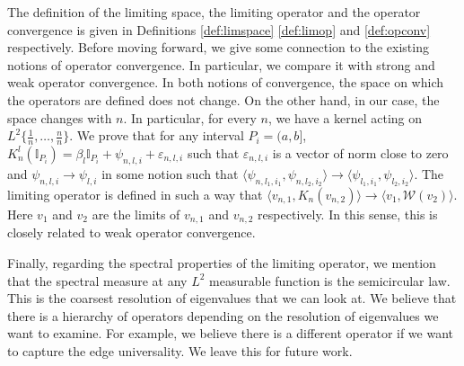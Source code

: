 \documentclass[reqno,12pt]{amsart}
\theoremstyle{plain}
\theoremstyle{definition}
\begin{document}
The definition of the limiting space, the limiting operator and the operator convergence is given in Definitions \ref{def:limspace} \ref{def:limop} and \ref{def:opconv} respectively. Before moving forward, we give some connection to the existing notions of operator convergence. In particular, we compare it with strong and weak operator convergence. In both notions of convergence, the space on which the operators are defined does not change. On the other hand, in our case, the space changes with $n$. In particular, for every $n$, we have a kernel acting on $L^{2}\{\frac{1}{n},\ldots, \frac{n}{n}\}$. We prove that for any interval $P_{i}=(a,b]$, $K_{n}^{l}(\mathbb{I}_{P_{i}})=\beta_{l}\mathbb{I}_{P_{i}}+ \psi_{n,l,i}+ \varepsilon_{n,l,i}$ such that $\varepsilon_{n,l,i}$ is a vector of norm close to zero and $ \psi_{n,l,i} \to \psi_{l,i}$ in some notion such that $\langle \psi_{n,l_{1},i_{1}},\psi_{n,l_{2},i_{2}} \rangle \to \langle \psi_{l_{1},i_{1}}, \psi_{l_{2},i_{2}} \rangle $. The limiting operator is defined in such a way that  $\langle v_{n,1}, K_{n}(v_{n,2}) \rangle \to \langle v_{1}, \mathcal{W}(v_{2}) \rangle$. Here $v_{1}$ and $v_{2}$ are the limits of $v_{n,1}$ and $v_{n,2}$ respectively. In this sense, this is closely related to weak operator convergence. 

Finally, regarding the spectral properties of the limiting operator, we mention that the spectral measure at any $L^{2}$ measurable function is the semicircular law. This is the coarsest resolution of eigenvalues that we can look at. We believe that there is a hierarchy of operators depending on the resolution of eigenvalues we want to examine. For example, we believe there is a different operator if we want to capture the edge universality. We leave this for future work.  
\end{document}
